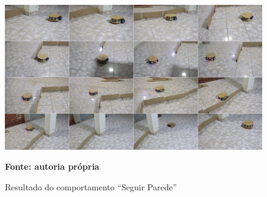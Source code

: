 \begin{figure}[!ht]
\centering
\caption{Resultado do comportamento ``Seguir Parede''}
\label{fig:resultadoImplementadoSP}
		\centering
		\includegraphics[clip, 
scale=0.29]{Figuras/ComportamentoSPCompactado}%

	\textbf{Fonte: autoria própria}
\end{figure}
